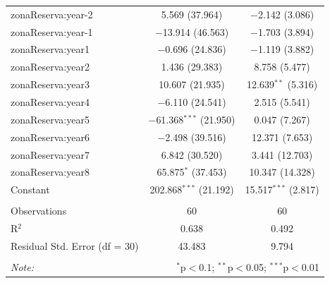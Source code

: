 \documentclass[10pt]{article}
\begin{document}
\begin{table}[h]
\begin{tabular}{@{\extracolsep{1pt}}lcc}
  zonaReserva:year-2 & 5.569 (37.964) & $-$2.142 (3.086) \\ 
  zonaReserva:year-1 & $-$13.914 (46.563) & $-$1.703 (3.894) \\ 
  zonaReserva:year1 & $-$0.696 (24.836) & $-$1.119 (3.882) \\ 
  zonaReserva:year2 & 1.436 (29.383) & 8.758 (5.477) \\ 
  zonaReserva:year3 & 10.607 (21.935) & 12.639$^{**}$ (5.316) \\ 
  zonaReserva:year4 & $-$6.110 (24.541) & 2.515 (5.541) \\ 
  zonaReserva:year5 & $-$61.368$^{***}$ (21.950) & 0.047 (7.267) \\ 
  zonaReserva:year6 & $-$2.498 (39.516) & 12.371 (7.653) \\ 
  zonaReserva:year7 & 6.842 (30.520) & 3.441 (12.703) \\ 
  zonaReserva:year8 & 65.875$^{*}$ (37.453) & 10.347 (14.328) \\ 
  Constant & 202.868$^{***}$ (21.192) & 15.517$^{***}$ (2.817) \\ 
 \hline \\[-1.8ex] 
Observations & 60 & 60 \\ 
R$^{2}$ & 0.638 & 0.492 \\ 
Residual Std. Error (df = 30) & 43.483 & 9.794 \\ 
\hline 
\hline \\[-1.8ex] 
\textit{Note:}  & \multicolumn{2}{r}{$^{*}$p$<$0.1; $^{**}$p$<$0.05; $^{***}$p$<$0.01} \\ 
\end{tabular} 
\end{table}

\clearpage
\end{document}
